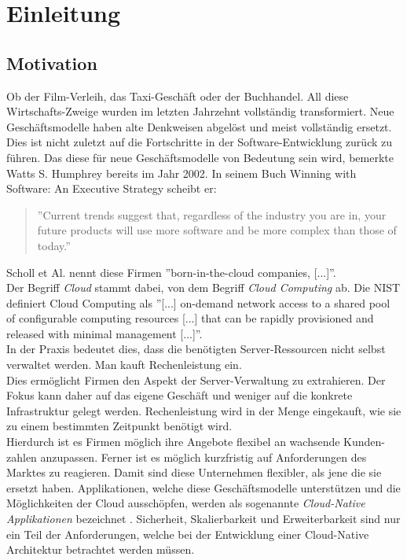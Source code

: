 \chapter{Einleitung}

\section{Motivation}
Ob der Film-Verleih, das Taxi-Geschäft oder der Buchhandel. All diese Wirtschafts-Zweige wurden im letzten Jahrzehnt vollständig transformiert.  Neue Geschäftsmodelle haben alte Denkweisen abgelöst und meist vollständig ersetzt. Dies ist nicht zuletzt auf die Fortschritte in der Software-Entwicklung zurück zu führen. Das diese für neue Geschäftsmodelle von Bedeutung sein wird, bemerkte Watts S. Humphrey bereits im Jahr 2002. In seinem Buch Winning with Software: An Executive Strategy scheibt er: 
\begin{quote}
''Current trends suggest that, regardless of the industry you are in, your future products will use more software and be more complex than those of today.'' \cite{humphrey_why_2002}
\end{quote}
Scholl et Al. nennt diese Firmen ''born-in-the-cloud companies, [...]''\cite{scholl_cloud_2019}.\\
Der Begriff \textit{Cloud} stammt dabei, von dem Begriff \textit{Cloud Computing} ab. Die NIST definiert Cloud Computing als ''[...] on-demand network access to a shared pool of configurable computing resources [...] that can be rapidly provisioned and released with minimal management [...]''\cite{mell_nist_2011}.\\
In der Praxis bedeutet dies, dass die benötigten Server-Ressourcen nicht selbst verwaltet werden. Man kauft Rechenleistung ein.\\
Dies ermöglicht Firmen den Aspekt der Server-Verwaltung zu extrahieren. Der Fokus kann daher auf das eigene Geschäft und weniger auf die konkrete Infrastruktur gelegt werden. Rechenleistung wird in der Menge eingekauft, wie sie zu einem bestimmten Zeitpunkt benötigt wird.\\
Hierdurch ist es Firmen möglich ihre Angebote flexibel an wachsende Kunden-zahlen anzupassen. Ferner ist es möglich kurzfristig auf Anforderungen des Marktes zu reagieren. Damit sind diese Unternehmen flexibler, als jene die sie ersetzt haben. Applikationen, welche diese Geschäftsmodelle unterstützen und die Möglichkeiten der Cloud ausschöpfen, werden als sogenannte \textit{Cloud-Native Applikationen} bezeichnet \cite{scholl_cloud_2019}.  Sicherheit, Skalierbarkeit und Erweiterbarkeit sind nur ein Teil der Anforderungen, welche bei der Entwicklung einer Cloud-Native Architektur betrachtet werden müssen. 

